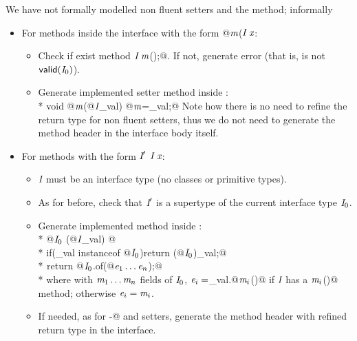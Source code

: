 We have not formally modelled non fluent setters and the \Q@with@ method; informally
\begin{itemize}
\item For methods inside the interface with the form \Q@void @$\textit{m}$\QM($\C\ \x$\QM{);}:
  \begin{itemize}
    \item Check if exist method $\C\ \m$\Q@();@. If not, generate error (that is, is not $\textsf{valid}(\textit{I}_0)$).
    \item Generate implemented setter method inside \Q@of@:\\*
           \Q@public void @$\textit{m}$\Q@(@$\textit{I}$\Q@ _val) { @$\textit{m}$\Q@=_val;}@
    Note how there is no need to refine the return type for non fluent setters, thus we do not need to generate the method header in the interface body itself.
    \end{itemize}
\item For methods with the form $\C'\ $$\C\ \x$\QM{);}:
  \begin{itemize}
   \item $\textit{I}$ must be an interface type (no classes or primitive types).
    \item As for before, check that $\textit{I}'$ is a supertype of the current interface type $\textit{I}_0$.
    \item Generate implemented \Q@with@ method inside \Q@of@:\\*
           \Q@public @$\textit{I}_0\ $\Q@with(@$\textit{I}$\Q@ _val) { @\\*
           \Q@  if(_val instanceof @$\textit{I}_0$\Q@){return (@$\textit{I}_0$\Q@)_val;}@\\*
${}_{}$\Q@  return @$\textit{I}_0$\Q@.of(@$\textit{e}_1\ldots\textit{e}_n$\Q@);}@\\*
where with $\textit{m}_1\ldots\textit{m}_n$  fields of $\textit{I}_0$,
$\textit{e}_i=$\Q@_val.@$\textit{m}_i$\Q@()@ if $\textit{I}$ has a $\textit{m}_i$\Q@()@ method; otherwise
$\textit{e}_i=\textit{m}_i$.
    \item If needed, as for \Q@with-@ and setters, generate the method header with refined return type in the interface.
 \end{itemize}

\end{itemize}

